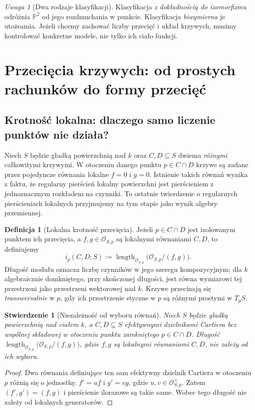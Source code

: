 \documentclass[11pt,a4paper,openany]{report}
\numberwithin{equation}{section}
\theoremstyle{plain}
\newtheorem{stwierdzenie}[twierdzenie]{Stwierdzenie}
\theoremstyle{definition}
\newtheorem{definicja}[twierdzenie]{Definicja}
\theoremstyle{remark}
\newtheorem{uwaga}[twierdzenie]{Uwaga}
\newcommand{\PP}{\mathbb P}
\begin{document}
\begin{uwaga}[Dwa rodzaje klasyfikacji]
Klasyfikacja \emph{z dokładnością do izomorfizmu} odróżnia
$\PP^2$ od jego rozdmuchania w punkcie. Klasyfikacja
\emph{biwymierna} je utożsamia. Jeżeli chcemy zachować
liczby przecięć i układ krzywych, musimy kontrolować
konkretne modele, nie tylko ich ciało funkcji.
\end{uwaga}

\section{Przecięcia krzywych: od prostych rachunków do formy przecięć}
\label{sec:ga6-intersections}

\subsection{Krotność lokalna: dlaczego samo liczenie punktów nie działa?}

Niech $S$ będzie gładką powierzchnią nad $k$ oraz $C,D\subseteq S$
dwiema \emph{różnymi} całkowitymi krzywymi. W otoczeniu danego
punktu $p\in C\cap D$ krzywe są zadane przez pojedyncze równania
lokalne $f=0$ i $g=0$. Istnienie takich równań wynika z faktu,
że regularny pierścień lokalny powierzchni jest pierścieniem
z jednoznacznym rozkładem na czynniki. To ostatnie twierdzenie
o regularnych pierścieniach lokalnych przyjmujemy na tym etapie
jako wynik algebry przemiennej.

\begin{definicja}[Lokalna krotność przecięcia]
\label{def:ga6-intersection-local}
Jeżeli $p\in C\cap D$ jest izolowanym punktem ich przecięcia,
a $f,g\in\mathcal O_{S,p}$ są lokalnymi równaniami $C,D$,
to definiujemy
\[
 i_p(C,D;S):=\operatorname{length}_{\mathcal O_{S,p}}
   \bigl(\mathcal O_{S,p}/(f,g)\bigr).
\]
Długość modułu oznacza liczbę czynników w jego szeregu
kompozycyjnym; dla $k$ algebraicznie domkniętego, przy
skończonej długości, jest równa wymiarowi tej przestrzeni
jako przestrzeni wektorowej nad $k$. Krzywe przecinają się
\emph{transwersalnie} w $p$, gdy ich przestrzenie styczne w $p$
są różnymi prostymi w $T_pS$.
\end{definicja}

\begin{stwierdzenie}[Niezależność od wyboru równań]
\label{st:ga6-independent-local}
Niech $S$ będzie gładką powierzchnią nad ciałem $k$,
a $C,D\subseteq S$ efektywnymi dzielnikami Cartiera
bez wspólnej składowej w otoczeniu punktu zamkniętego
$p\in C\cap D$. Długość
$\operatorname{length}_{\mathcal O_{S,p}}
\bigl(\mathcal O_{S,p}/(f,g)\bigr)$, gdzie $f,g$
są lokalnymi równaniami $C,D$, nie zależy od ich wyboru.
\end{stwierdzenie}
\begin{proof}
Dwa równania definiujące ten sam efektywny dzielnik
Cartiera w otoczeniu $p$ różnią się o jednostkę:
$f'=uf$ i $g'=vg$, gdzie $u,v\in\mathcal O_{S,p}^{\times}$.
Zatem $(f',g')=(f,g)$ i pierścienie ilorazowe są takie same.
Wobec tego długość nie zależy od lokalnych generatorów.
\end{proof}
\end{document}
